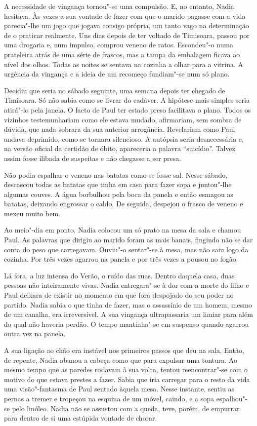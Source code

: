 A necessidade de vingança tornou"-se uma compulsão. E, no entanto, Nadia
hesitava. Às vezes a sua vontade de fazer com que o marido pagasse com a
vida parecia"-lhe um jogo que jogava consigo própria, um tanto vago na
determinação de o praticar realmente. Uns dias depois de ter voltado
de Timisoara, passou por uma drogaria e, num impulso, comprou veneno de
ratos. Escondeu"-o numa prateleira atrás de uma série de frascos, mas a
tampa da embalagem ficava ao nível dos olhos. Todas as noites se
sentava na cozinha a olhar para a vitrina. A urgência da vingança e a
ideia de um recomeço fundiam"-se num só plano.

Decidiu que seria no sábado seguinte, uma semana depois ter chegado de
Timisoara. Só não sabia como se livrar do cadáver. A hipótese mais
simples seria atirá"-lo pela janela. O facto de Paul ter estado preso
facilitava o plano. Todos os vizinhos testemunhariam como ele estava
mudado, afirmariam, sem sombra de dúvida, que nada sobrara da sua
anterior arrogância. Revelariam como Paul andava deprimido, como se
tornara silencioso. A autópsia seria desnecessária e, na versão oficial
da certidão de óbito, apareceria a palavra ``suicídio''. Talvez assim
fosse ilibada de suspeitas e não chegasse a ser presa.

Não podia espalhar o veneno nas batatas como se fosse sal. Nesse sábado,
descascou todas as batatas que tinha em casa para fazer sopa e
juntou"-lhe algumas couves. A água borbulhou pela boca da panela e então
esmagou as batatas, deixando engrossar o caldo. De seguida, despejou o
frasco de veneno e mexeu muito bem.

Ao meio"-dia em ponto, Nadia colocou um só prato na mesa da sala e chamou
Paul. As palavras que dirigiu ao
marido foram as mais banais, fingindo não se dar conta do peso que
carregavam. Ouviu"-o sentar"-se à mesa, mas não saiu logo da cozinha. Por
três vezes agarrou na panela e por três vezes a pousou no fogão.

Lá fora, a luz intensa do Verão, o ruído das ruas. Dentro daquela casa,
duas pessoas não inteiramente vivas. Nadia entregara"-se à dor com a
morte do filho e Paul deixara de existir no momento em que fora
despojado do seu poder no partido. Nadia sabia o que tinha de fazer, mas
o assassínio de um homem, mesmo de um canalha, era irreversível. A
sua vingança ultrapassaria um limiar para além do qual não haveria
perdão. O tempo mantinha"-se em suspenso quando agarrou outra vez na
panela.

A sua ligação ao chão era instável nos primeiros passos que deu na sala.
Então, de repente, Nadia abanou a cabeça como que para expulsar uma
tontura. Ao mesmo tempo que as paredes rodavam à sua volta, tentou
reencontrar"-se com o motivo do que estava prestes a fazer. Sabia que
iria carregar para o resto da vida uma visão"-fantasma de Paul sentado
àquela mesa. Nesse instante, sentiu as pernas a tremer e tropeçou na
esquina de um móvel, caindo, e a sopa espalhou"-se pelo linóleo. Nadia
não se assustou com a queda, teve, porém, de empurrar para dentro de si
uma estúpida vontade de chorar.

